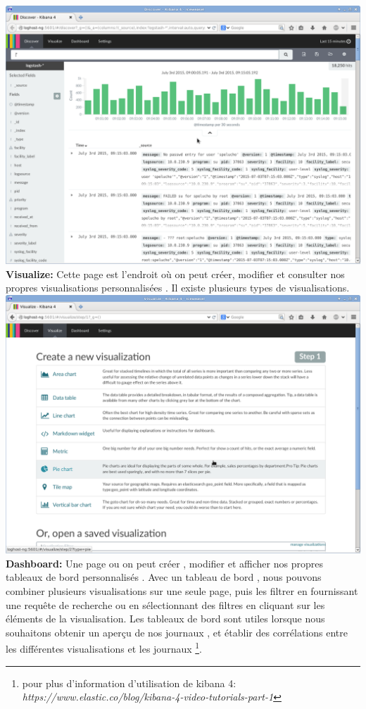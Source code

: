 \documentclass[11pt,a4paper]{article}
\begin{document}
\includegraphics[scale=0.3]{discover.png} \\

\textbf{Visualize:} Cette page est l'endroit où on peut créer, modifier et consulter nos propres visualisations personnalisées . Il existe plusieurs types de visualisations.\\

\includegraphics[scale=0.3]{visualize.png} \\

\textbf{Dashboard:} Une page ou on peut créer , modifier et afficher nos propres tableaux de bord personnalisés . Avec un tableau de bord , nous pouvons combiner plusieurs visualisations sur une seule page, puis les filtrer en fournissant une requête de recherche ou en sélectionnant des filtres en cliquant sur les éléments de la visualisation. Les tableaux de bord sont utiles lorsque nous souhaitons obtenir un aperçu de nos journaux , et établir des corrélations entre les différentes visualisations et les journaux \footnote{pour plus d'information d'utilisation de kibana 4: \textit{https://www.elastic.co/blog/kibana-4-video-tutorials-part-1}}.\\
\end{document}
